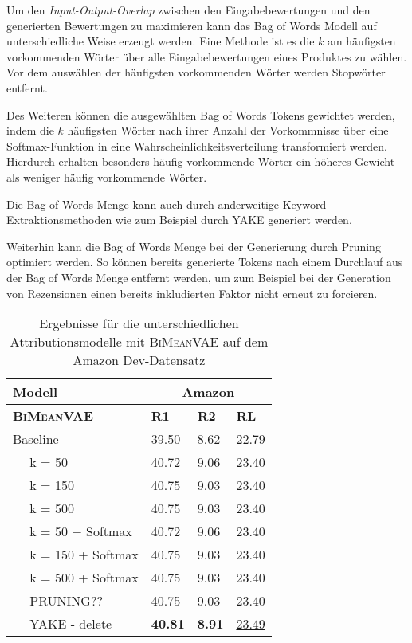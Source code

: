 Um den \textit{Input-Output-Overlap} zwischen den Eingabebewertungen und den generierten Bewertungen zu maximieren kann das Bag of Words Modell auf unterschiedliche Weise erzeugt werden. 
Eine Methode ist es die $k$ am häufigsten vorkommenden Wörter über alle Eingabebewertungen eines Produktes zu wählen.
Vor dem auswählen der häufigsten vorkommenden Wörter werden Stopwörter entfernt.

Des Weiteren können die ausgewählten Bag of Words Tokens gewichtet werden, indem die $k$ häufigsten Wörter nach ihrer Anzahl der Vorkommnisse über eine Softmax-Funktion in eine Wahrscheinlichkeitsverteilung transformiert werden.
Hierdurch erhalten besonders häufig vorkommende Wörter ein höheres Gewicht als weniger häufig vorkommende Wörter.

Die Bag of Words Menge kann auch durch anderweitige Keyword-Extraktionsmethoden wie zum Beispiel durch YAKE \citep{CAMPOS2020257} generiert werden.

Weiterhin kann die Bag of Words Menge bei der Generierung durch Pruning optimiert werden. 
So können bereits generierte Tokens nach einem Durchlauf aus der Bag of Words Menge entfernt werden, um zum Beispiel bei der Generation von Rezensionen einen bereits inkludierten Faktor nicht erneut zu forcieren.

\begin{table}[h!]
    \centering
    \begin{tabular}{@{}llll@{}}
    \toprule
                    Modell   & \multicolumn{3}{c}{Amazon}              \\ \midrule
    \textbf{\textsc{BiMeanVAE} }    & \textbf{R1} & \textbf{R2} & \textbf{RL} \\ \midrule
    Baseline        & 39.50       & 8.62    &  22.79     \\
    $\quad$ k = 50       &  40.72    &   9.06    &    23.40   \\
    $\quad$ k = 150  &  40.75   &    9.03  &  23.40  \\
    $\quad$ k = 500 &  40.75   &    9.03  &  23.40  \\
    $\quad$ k = 50 + Softmax    &  40.72    &   9.06    &    23.40   \\
    $\quad$ k = 150 + Softmax  &  40.75   &    9.03  &  23.40  \\
    $\quad$ k = 500 + Softmax   &  40.75   &    9.03  &  23.40  \\
    $\quad$ PRUNING??   &  40.75   &    9.03  &  23.40  \\
    $\quad$ YAKE - delete&  \textbf{40.81}   &     \textbf{8.91}  &   \underline{23.49}    \\ \bottomrule
    \end{tabular}
    \caption{Ergebnisse für die unterschiedlichen Attributionsmodelle mit \textsc{BiMeanVAE} auf dem Amazon Dev-Datensatz}
    \label{bow_opti}
\end{table}

